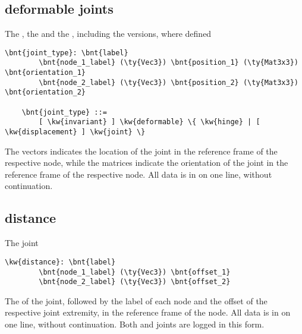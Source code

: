 \subsection{deformable joints}
The , the 
and the , including the 
versions, where defined
\begin{Verbatim}[commandchars=\\\{\}]
    \bnt{joint_type}: \bnt{label}
        \bnt{node_1_label} (\ty{Vec3}) \bnt{position_1} (\ty{Mat3x3}) \bnt{orientation_1}
        \bnt{node_2_label} (\ty{Vec3}) \bnt{position_2} (\ty{Mat3x3}) \bnt{orientation_2}

    \bnt{joint_type} ::=
        [ \kw{invariant} ] \kw{deformable} \{ \kw{hinge} | [ \kw{displacement} ] \kw{joint} \}
\end{Verbatim}
The  vectors indicates the location of the joint
in the reference frame of the respective node,
while the  matrices indicate the orientation of the joint
in the reference frame of the respective node.
All data is in on one line, without continuation.

\subsection{distance}
The  joint
\begin{Verbatim}[commandchars=\\\{\}]
    \kw{distance}: \bnt{label}
        \bnt{node_1_label} (\ty{Vec3}) \bnt{offset_1}
        \bnt{node_2_label} (\ty{Vec3}) \bnt{offset_2}
\end{Verbatim}
The  of the joint, followed by the label of each node
and the offset of the respective joint extremity,
in the reference frame of the node.
All data is in on one line, without continuation.
Both  and  joints are logged
in this form.

